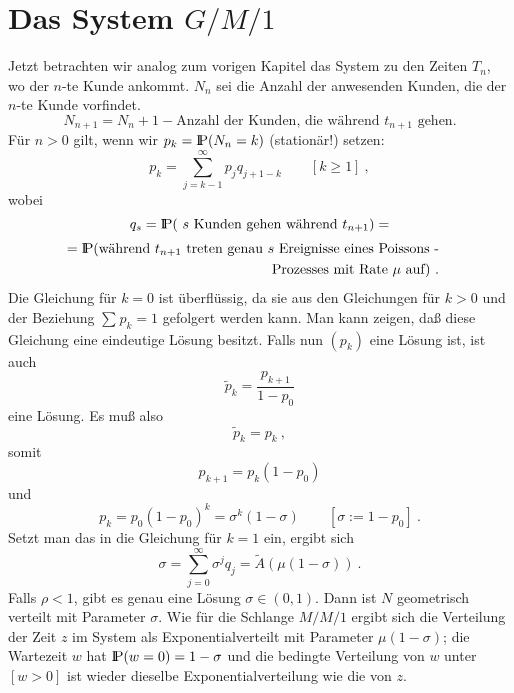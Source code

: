 \section{Das System $G/M/1$}
Jetzt betrachten wir analog zum vorigen Kapitel das System zu den Zeiten
$T_{n}$, wo der $n$-te Kunde ankommt. $N_{n}$ sei die Anzahl der
anwesenden Kunden, die der $n$-te Kunde vorfindet.
\begin{displaymath}
N_{n+1} = N_{n}+1-\mbox{Anzahl der Kunden, die während $t_{n+1}$ gehen.}
\end{displaymath}
Für $n>0$ gilt, wenn wir $p_{k}= {\rm I\kern-0.2em P} (N_{n}=k)$ (stationär!) setzen:
\begin{displaymath}
p_{k} = \sum_{j=k-1}^{\infty} p_{j} q_{j+1-k} \qquad [k \geq 1] ~,
\end{displaymath}
wobei
\begin{displaymath}
q_{s} = {\rm I\kern-0.2em P} (\mbox{ $s$ Kunden gehen während
$t_{n+1}$)} =
\end{displaymath}
\begin{eqnarray*}
= {\rm I\kern-0.2em P} (\mbox{während $t_{n+1}$ treten genau $s$ Ereignisse eines Poissons
-} \\
\mbox{Prozesses mit Rate $\mu$ auf)} ~. & &
\end{eqnarray*}
Die Gleichung für $k=0$ ist überflüssig, da sie aus den Gleichungen
für $k>0$ und der Beziehung $\sum_{}^{} p_{k}=1$ gefolgert werden kann.
Man kann zeigen, daß diese Gleichung eine eindeutige Lösung besitzt.
Falls nun $(p_{k})$ eine Lösung ist, ist auch
\begin{displaymath}
\tilde p_{k} = \frac{p_{k+1}}{1-p_{0}}
\end{displaymath}
eine Lösung. Es muß also
\begin{displaymath}
\tilde p_{k} = p_{k} ~,
\end{displaymath}
somit
\begin{displaymath}
p_{k+1} = p_{k}(1-p_{0})
\end{displaymath}
und
\begin{displaymath}
p_{k} = p_{0}(1-p_{0})^{k} =
\sigma^{k}(1- \sigma) \qquad [ \sigma := 1 - p_{0}] ~.
\end{displaymath}
Setzt man das in die Gleichung für $k=1$ ein, ergibt sich
\begin{displaymath}
\sigma = \sum_{j=0}^{\infty} \sigma^{j} q_{j} = \tilde A (\mu(1-\sigma))
~.
\end{displaymath}
Falls $\rho < 1$, gibt es genau eine Lösung $\sigma \in (0,1)$. Dann ist
$N$ geometrisch verteilt mit Parameter $\sigma$. Wie für die Schlange
$M/M/1$ ergibt sich die Verteilung der Zeit $z$ im System als
Exponentialverteilt mit Parameter $\mu(1- \sigma)$; die Wartezeit $w$ hat
${\rm I\kern-0.2em P} (w=0)= 1 - \sigma$ und die bedingte Verteilung von $w$ unter $[w>0]$
ist wieder dieselbe Exponentialverteilung wie die von $z$.
